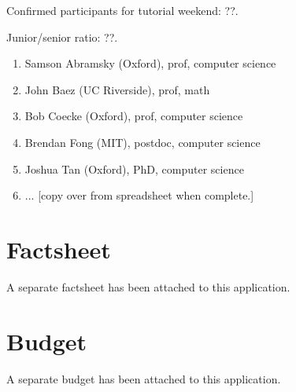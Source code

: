 \documentclass{article}
\begin{document}
Confirmed participants for tutorial weekend: ??. 

Junior/senior ratio: ??.

\begin{enumerate}
\item Samson Abramsky (Oxford), prof, computer science
\item John Baez (UC Riverside), prof, math
\item Bob Coecke (Oxford), prof, computer science
\item Brendan Fong (MIT), postdoc, computer science
\item Joshua Tan (Oxford), PhD, computer science
\item ... [copy over from spreadsheet when complete.]
\end{enumerate}

\section{Factsheet}
A separate factsheet has been attached to this application.

\section{Budget}
A separate budget has been attached to this application.
\end{document}
